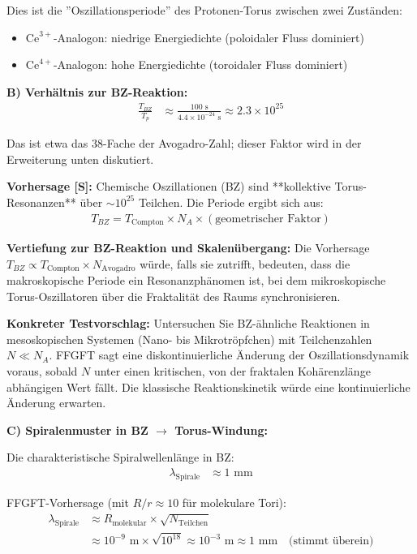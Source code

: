 Dies ist die ''Oszillationsperiode'' des Protonen-Torus zwischen zwei Zuständen:
\begin{itemize}
	\item $\text{Ce}^{3+}$-Analogon: niedrige Energiedichte (poloidaler Fluss dominiert)
	\item $\text{Ce}^{4+}$-Analogon: hohe Energiedichte (toroidaler Fluss dominiert)
\end{itemize}

\textbf{B) Verhältnis zur BZ-Reaktion:}
\begin{align*}
	\frac{T_{BZ}}{T_p} &\approx \frac{100 \text{ s}}{4.4 \times 10^{-24} \text{ s}} \approx 2.3 \times 10^{25}
\end{align*}

Das ist etwa das 38-Fache der Avogadro-Zahl; dieser Faktor wird in der Erweiterung unten diskutiert.

\textbf{Vorhersage [S]:} Chemische Oszillationen (BZ) sind **kollektive Torus-Resonanzen** über $\sim 10^{25}$ Teilchen. Die Periode ergibt sich aus:
\begin{align*}
	T_{BZ} = T_{\text{Compton}} \times N_A \times (\text{geometrischer Faktor})
\end{align*}

\textbf{Vertiefung zur BZ-Reaktion und Skalenübergang:}
Die Vorhersage $T_{BZ} \propto T_{\text{Compton}} \times N_{\text{Avogadro}}$ würde, falls sie zutrifft, bedeuten, dass die makroskopische Periode ein Resonanzphänomen ist, bei dem mikroskopische Torus-Oszillatoren über die Fraktalität des Raums synchronisieren.

\textbf{Konkreter Testvorschlag:} Untersuchen Sie BZ-ähnliche Reaktionen in mesoskopischen Systemen (Nano- bis Mikrotröpfchen) mit Teilchenzahlen $N \ll N_A$. FFGFT sagt eine diskontinuierliche Änderung der Oszillationsdynamik voraus, sobald $N$ unter einen kritischen, von der fraktalen Kohärenzlänge abhängigen Wert fällt. Die klassische Reaktionskinetik würde eine kontinuierliche Änderung erwarten.

\textbf{C) Spiralenmuster in BZ $\rightarrow$ Torus-Windung:}

Die charakteristische Spiralwellenlänge in BZ:
\begin{align*}
	\lambda_{\text{Spirale}} &\approx 1 \text{ mm}
\end{align*}

FFGFT-Vorhersage (mit $R/r \approx 10$ für molekulare Tori):
\begin{align*}
	\lambda_{\text{Spirale}} &\approx R_{\text{molekular}} \times \sqrt{N_{\text{Teilchen}}} \\
	&\approx 10^{-9} \text{ m} \times \sqrt{10^{18}} \approx 10^{-3} \text{ m} \approx 1 \text{ mm} \quad \text{(stimmt überein)}
\end{align*}

